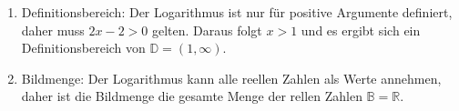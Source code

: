 \item
\begin{enumerate}
\item Definitionsbereich: Der Logarithmus ist nur für positive Argumente definiert, daher muss $2x-2>0$ gelten. Daraus folgt $x>1$ und es ergibt sich ein Definitionsbereich von $\mathbb{D} = (1,\infty)$.
\item Bildmenge: Der Logarithmus kann alle reellen Zahlen als Werte annehmen, daher ist die Bildmenge die gesamte Menge der rellen Zahlen $\mathbb{B} = \mathbb{R}$.
\end{enumerate}


